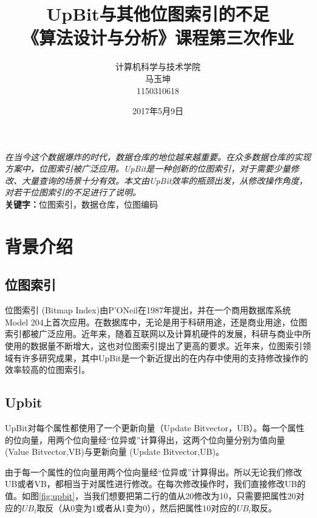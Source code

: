 \documentclass[11pt, a4paper]{article}
\begin{document}
\title{{\bf\Huge UpBit与其他位图索引的不足} \\[2ex]{\huge 《算法设计与分析》课程第三次作业}}
  \author{计算机科学与技术学院\\马玉坤\\1150310618}
  \date{2017年5月9日}
  \maketitle

  \emph{在当今这个数据爆炸的时代，数据仓库的地位越来越重要。在众多数据仓库的实现方案中，位图索引被广泛应用。UpBit是一种创新的位图索引，对于需要少量修改、大量查询的场景十分有效。本文由UpBit效率的瓶颈出发，从修改操作角度，对若干位图索引的不足进行了说明。}\\
  {\bf 关键字：}位图索引，数据仓库，位图编码


  \section{背景介绍}

  \subsection{位图索引}

  位图索引 (Bitmap Index)由P’ONeil在1987年提出，并在一个商用数据库系统Model 204上首次应用。在数据库中，无论是用于科研用途，还是商业用途，位图索引都被广泛应用。近年来，随着互联网以及计算机硬件的发展，科研与商业中所使用的数据量不断增大，这也对位图索引提出了更高的要求。近年来，位图索引领域有许多研究成果，其中UpBit\cite{art1}是一个新近提出的在内存中使用的支持修改操作的效率较高的位图索引。

  \subsection{Upbit}

  UpBit对每个属性都使用了一个更新向量（Update Bitvector，UB）。每一个属性的位向量，用两个位向量经“位异或”计算得出，这两个位向量分别为值向量 (Value Bitvector,VB)与更新向量 (Update Bitvector,UB)。\cite{art1}

  由于每一个属性的位向量用两个位向量经“位异或”计算得出。所以无论我们修改UB或者VB，都相当于对属性进行修改。在每次修改操作时，我们直接修改UB的值。如图\ref{fig:upbit}，当我们想要把第二行的值从20修改为10，只需要把属性20对应的$UB_i$取反（从0变为1或者从1变为0），然后把属性10对应的$UB_i$取反。
\end{document}
